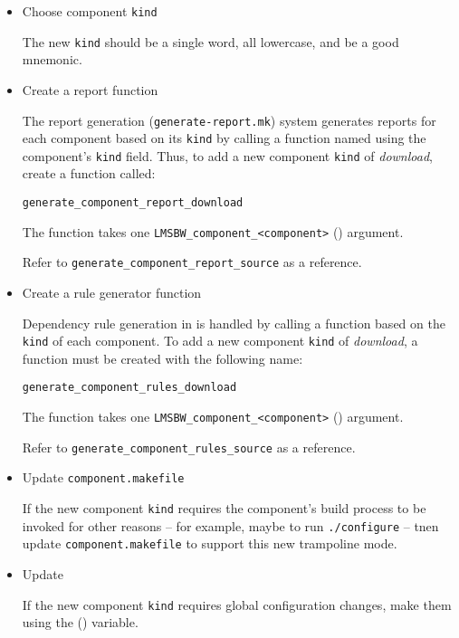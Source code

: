 \begin{itemize}
\item Choose component \texttt{kind}

  The new \texttt{kind} should be a single word, all lowercase, and be
  a good mnemonic.

\item Create a report function

  The report generation (\texttt{generate-report.mk}) system generates
  reports for each component based on its \texttt{kind} by calling a
  function named using the component's \texttt{kind} field.  Thus, to
  add a new component \texttt{kind} of \emph{download}, create a
  function called:

\begin{verbatim}
generate_component_report_download
\end{verbatim}

  The function takes one \texttt{LMSBW\_component\_<component>}
  () argument.

  Refer to \texttt{generate\_component\_report\_source} as a
  reference.

\item Create a rule generator function

  Dependency rule generation in \lmsbw is handled by calling a
  function based on the \texttt{kind} of each component.  To add a new
  component \texttt{kind} of \emph{download}, a function must be
  created with the following name:

\begin{verbatim}
generate_component_rules_download
\end{verbatim}

  The function takes one \texttt{LMSBW\_component\_<component>}
  () argument.

  Refer to \texttt{generate\_component\_rules\_source} as a reference.

\item Update \texttt{component.makefile}

  If the new component \texttt{kind} requires the component's build
  process to be invoked for other reasons -- for example, maybe to run
  \texttt{./configure} -- tnen update \texttt{component.makefile} to
  support this new trampoline mode.

\item Update \lmsbwconfiguration

  If the new component \texttt{kind} requires global configuration
  changes, make them using the \lmsbwconfiguration
  () variable.


\end{itemize}
